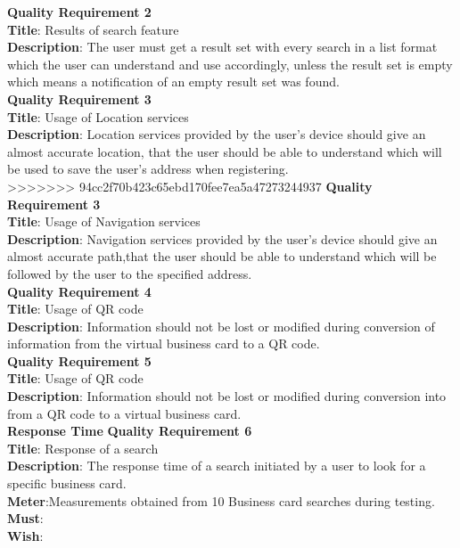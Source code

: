 \documentclass[english]{article}
\begin{document}
				\textbf{Quality Requirement 2}\\
				\textbf{Title}: Results of search feature\\
				\textbf{Description}: The user must get a result set with every search in a list format which the user can understand and use accordingly, unless the result set is empty which means a notification of an empty result set was found.\\
				
				\textbf{Quality Requirement 3}\\
				\textbf{Title}: Usage of Location services\\
				\textbf{Description}: Location services provided by the user's device should give an almost accurate location, that the user should be able to understand which will be used to save the user's address when registering.\\
				
>>>>>>> 94cc2f70b423c65ebd170fee7ea5a47273244937
				\textbf{Quality Requirement 3}\\
				\textbf{Title}: Usage of Navigation services\\
				\textbf{Description}: Navigation services provided by the user's device should give an almost accurate path,that the user should be able to understand which will be followed by the user to the specified address.\\
				
				\textbf{Quality Requirement 4}\\
				\textbf{Title}: Usage of QR code\\
				\textbf{Description}: Information should not be lost or modified during conversion of information from the virtual business card to a QR code.\\
				
				\textbf{Quality Requirement 5}\\
				\textbf{Title}: Usage of QR code\\
				\textbf{Description}: Information should not be lost or modified during conversion into from a QR code to a virtual business card.\\
				
				\textbf{Response Time}
				\textbf{Quality Requirement 6}\\
				\textbf{Title}: Response of a search\\
				\textbf{Description}: The response time of a search initiated by a user to look for a specific business card.\\
				\textbf{Meter}:Measurements obtained from 10 Business card searches during testing.\\
				\textbf{Must}:\\
				\textbf{Wish}:\\
				
\end{document}
